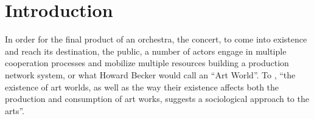 \documentclass[a4paper, 12pt, openright, oneside, german, french, brazil, english, article]{abntex2}
\begin{document}
	\textual
	\maketitle
	
	
	\section{Introduction}


	In order for the final product of an orchestra, the concert, to come into existence and reach its destination, the public, a number of actors engage in multiple cooperation processes and mobilize multiple resources building a production network system, or what Howard Becker would call an ``Art World''. To , ``the existence of art worlds, as well as the way their existence affects both the production and consumption of art works, suggests a sociological approach to the arts''.
	
\end{document}
